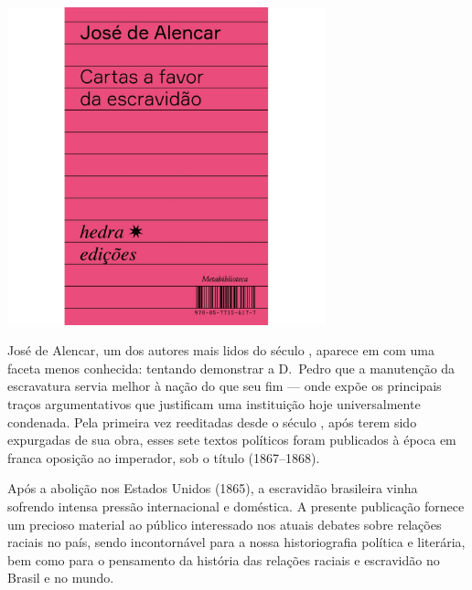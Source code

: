 \begin{center}
\hspace*{-2.5cm}
\hspace*{2.5cm}\includegraphics[width=92mm]{./grid/alencar.jpg}
\end{center}

\hspace*{-7cm}\hrulefill\hspace*{-7cm}

\medskip

\noindent{}José de Alencar, um dos autores mais lidos do século , aparece em {} com uma faceta menos conhecida: tentando demonstrar a D.~Pedro  que a manutenção da escravatura servia melhor à nação do que seu fim --- onde expõe os principais traços argumentativos que justificam uma instituição hoje universalmente condenada. Pela primeira vez reeditadas desde o século , após terem sido expurgadas de sua obra, esses sete textos políticos foram publicados à época em franca oposição ao imperador, sob o título {} (1867--1868).

Após a abolição nos Estados Unidos (1865), a escravidão brasileira vinha sofrendo intensa pressão internacional e doméstica. A presente publicação fornece um precioso material ao público interessado nos atuais debates sobre relações raciais no país, sendo incontornável para a nossa historiografia política e literária, bem como para o pensamento da história das relações raciais e escravidão no Brasil e no mundo.
\vfill

